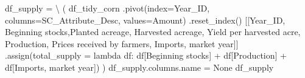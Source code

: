 \documentclass[
  letterpaper,
  DIV=11,
  numbers=noendperiod]{scrreprt}
\newenvironment{Shaded}{\begin{snugshade}}{\end{snugshade}}
\newcommand{\KeywordTok}[1]{\textcolor[rgb]{0.00,0.23,0.31}{#1}}
\newcommand{\NormalTok}[1]{\textcolor[rgb]{0.00,0.23,0.31}{#1}}
\newcommand{\OperatorTok}[1]{\textcolor[rgb]{0.37,0.37,0.37}{#1}}
\newcommand{\StringTok}[1]{\textcolor[rgb]{0.13,0.47,0.30}{#1}}
\newcommand{\VariableTok}[1]{\textcolor[rgb]{0.07,0.07,0.07}{#1}}
\begin{document}
\begin{Shaded}
\begin{Highlighting}[]
\NormalTok{df\_supply }\OperatorTok{=} \OperatorTok{\textbackslash{}}
\NormalTok{(}
\NormalTok{df\_tidy\_corn}
\NormalTok{    .pivot(index}\OperatorTok{=}\StringTok{\textquotesingle{}Year\_ID\textquotesingle{}}\NormalTok{, columns}\OperatorTok{=}\StringTok{\textquotesingle{}SC\_Attribute\_Desc\textquotesingle{}}\NormalTok{, values}\OperatorTok{=}\StringTok{\textquotesingle{}Amount\textquotesingle{}}\NormalTok{)}
\NormalTok{    .reset\_index()}
\NormalTok{    [[}\StringTok{\textquotesingle{}Year\_ID\textquotesingle{}}\NormalTok{, }\StringTok{\textquotesingle{}Beginning stocks\textquotesingle{}}\NormalTok{,}\StringTok{\textquotesingle{}Planted acreage\textquotesingle{}}\NormalTok{, }\StringTok{\textquotesingle{}Harvested acreage\textquotesingle{}}\NormalTok{, }\StringTok{\textquotesingle{}Yield per harvested acre\textquotesingle{}}\NormalTok{, }
      \StringTok{\textquotesingle{}Production\textquotesingle{}}\NormalTok{, }\StringTok{\textquotesingle{}Prices received by farmers\textquotesingle{}}\NormalTok{, }\StringTok{\textquotesingle{}Imports, market year\textquotesingle{}}\NormalTok{]]}
\NormalTok{    .assign(total\_supply }\OperatorTok{=} \KeywordTok{lambda}\NormalTok{ df: df[}\StringTok{\textquotesingle{}Beginning stocks\textquotesingle{}}\NormalTok{] }\OperatorTok{+}\NormalTok{ df[}\StringTok{\textquotesingle{}Production\textquotesingle{}}\NormalTok{] }\OperatorTok{+}\NormalTok{ df[}\StringTok{\textquotesingle{}Imports, market year\textquotesingle{}}\NormalTok{])}
\NormalTok{)}
\NormalTok{df\_supply.columns.name }\OperatorTok{=} \VariableTok{None}
\NormalTok{df\_supply}
\end{Highlighting}
\end{Shaded}
\end{document}
